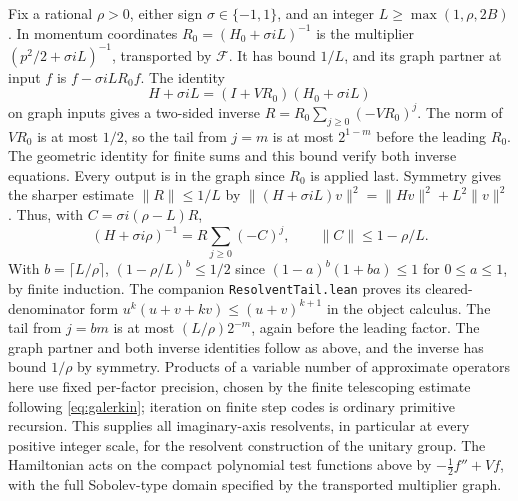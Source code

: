 Fix a rational $\rho>0$, either sign $\sigma\in\{-1,1\}$, and an
integer $L\ge\max(1,\rho,2B)$. In momentum coordinates
$R_0=(H_0+\sigma iL)^{-1}$ is the multiplier $(p^2/2+\sigma iL)^{-1}$,
transported by $\mathcal F$. It has bound $1/L$, and its graph
partner at input $f$ is $f-\sigma iL R_0 f$. The identity
\[
 H+\sigma iL=(I+V R_0)(H_0+\sigma iL)
\]
on graph inputs gives a two-sided inverse
$R=R_0\sum_{j\ge0}(-V R_0)^j$. The norm of $V R_0$ is at most $1/2$,
so the tail from $j=m$ is at most $2^{1-m}$ before the leading $R_0$.
The geometric identity for finite sums and this bound verify both inverse
equations. Every output is in the graph since $R_0$ is applied last.
Symmetry gives the sharper estimate $\|R\|\le1/L$ by
$\|(H+\sigma iL)v\|^2=\|Hv\|^2+L^2\|v\|^2$. Thus, with
$C=\sigma i(\rho-L)R$,
\[
 (H+\sigma i\rho)^{-1}
     = R\sum_{j\ge0}(-C)^j,\qquad \|C\|\le 1-\rho/L.
\]
With $b=\lceil L/\rho\rceil$, $(1-\rho/L)^b\le1/2$
since $(1-a)^b(1+ba)\le1$ for $0\le a\le1$, by finite induction.
The companion \texttt{ResolventTail.lean} proves its cleared-denominator
form $u^k(u+v+kv)\le(u+v)^{k+1}$ in the object calculus.
The tail from $j=bm$ is at most $(L/\rho)2^{-m}$, again before the
leading factor. The graph partner and both inverse identities follow
as above, and the inverse has bound $1/\rho$ by symmetry.
Products of a variable number of approximate operators here use fixed
per-factor precision, chosen by the finite telescoping estimate
following \eqref{eq:galerkin}; iteration on finite step codes is
ordinary primitive recursion. This supplies all imaginary-axis
resolvents, in particular at every positive integer scale, for the
resolvent construction of the unitary group. The Hamiltonian acts on the
compact polynomial test functions above by
$-\tfrac12 f''+Vf$, with the full Sobolev-type domain specified by
the transported multiplier graph.
